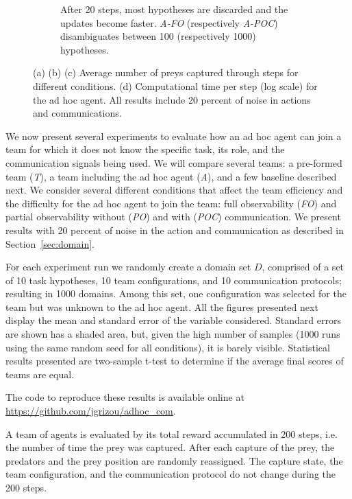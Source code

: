 \begin{figure}[t]
\begin{subfigure}[t]{0.245\textwidth}
    \caption{After 20 steps, most hypotheses are discarded and the updates become faster. \emph{A-FO} (respectively \emph{A-POC}) disambiguates between 100 (respectively 1000) hypotheses.}
    \label{fig:comptime}
  \end{subfigure}
  \caption{(a) (b) (c) Average number of preys captured through steps for different conditions. (d) Computational time per step (log scale) for the ad hoc agent. All results include 20 percent of noise in actions and communications.\vspace{-0.3cm}}
  \label{fig:results}
\end{figure}

We now present several experiments to evaluate how an ad hoc agent can join a team for which it does not know the specific task, its role, and the communication signals being used. We will compare several teams: a pre-formed team (\emph{T}), a team including the ad hoc agent (\emph{A}), and a few baseline described next. We consider several different conditions that affect the team efficiency and the difficulty for the ad hoc agent to join the team: full observability (\emph{FO}) and partial observability without (\emph{PO}) and with (\emph{POC}) communication. We present results with 20 percent of noise in the action and communication as described in Section~\ref{sec:domain}.

For each experiment run we randomly create a domain set $D$, comprised of a set of 10 task hypotheses, 10 team configurations, and 10 communication protocols; resulting in 1000 domains. Among this set, one configuration was selected for the team but was unknown to the ad hoc agent. All the figures presented next display the mean and standard error of the variable considered. Standard errors are shown has a shaded area, but, given the high number of samples (1000 runs using the same random seed for all conditions), it is barely visible. Statistical results presented are two-sample t-test to determine if the average final scores of teams are equal.

The code to reproduce these results is available online at \url{https://github.com/jgrizou/adhoc_com}.

A team of agents is evaluated by its total reward accumulated in 200 steps, i.e. the number of time the prey was captured. After each capture of the prey, the predators and the prey position are randomly reassigned. The capture state, the team configuration, and the communication protocol do not change during the 200 steps.

